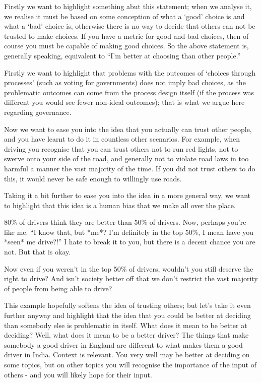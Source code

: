 \documentclass[twoside]{article}
\begin{document}
Firstly we want to highlight something abut this statement; when we analyse it, we realise it must be based on some conception of what a ‘good’ choice is and what a ‘bad’ choice is, otherwise there is no way to decide that others can not be trusted to make choices. If you have a metric for good and bad choices, then of course you must be capable of making good choices. So the above statement is, generally speaking, equivalent to “I’m better at choosing than other people.”

Firstly we want to highlight that problems with the outcomes of ‘choices through processes’ (such as voting for governments) does not imply bad choices, as the problematic outcomes can come from the process design itself (if the process was different you would see fewer non-ideal outcomes); that is what we argue here regarding governance.

Now we want to ease you into the idea that you actually can trust other people, and you have learnt to do it in countless other scenarios. For example, when driving you recognise that you can trust others not to run red lights, not to swerve onto your side of the road, and generally not to violate road laws in too harmful a manner the vast majority of the time. If you did not trust others to do this, it would never be safe enough to willingly use roads.

Taking it a bit further to ease you into the idea in a more general way, we want to highlight that this idea is a human bias that we make all over the place.

80\% of drivers think they are better than 50\% of drivers. Now, perhaps you’re like me. “I know that, but *me*? I’m definitely in the top 50\%, I mean have you *seen* me drive?!” I hate to break it to you, but there is a decent chance you are not. But that is okay.

Now even if you weren’t in the top 50\% of drivers, wouldn’t you still deserve the right to drive? And isn’t society better off that we don’t restrict the vast majority of people from being able to drive?

This example hopefully softens the idea of trusting others; but let’s take it even further anyway and highlight that the idea that you could be better at deciding than somebody else is problematic in itself. What does it mean to be better at deciding? Well, what does it mean to be a better driver? The things that make somebody a good driver in England are different to what makes them a good driver in India. Context is relevant. You very well may be better at deciding on some topics, but on other topics you will recognise the importance of the input of others - and you will likely hope for their input.
\end{document}
